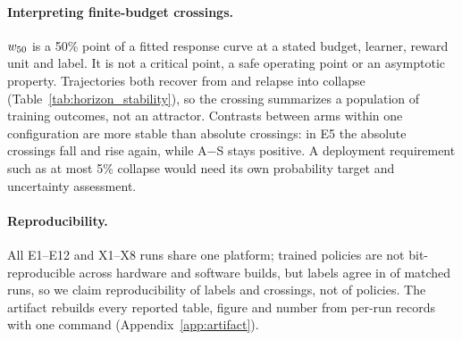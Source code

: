 \paragraph{Interpreting finite-budget crossings.}
$w_{50}$ is a 50\% point of a fitted response curve at a stated budget, learner, reward unit and label. It is
not a critical point, a safe operating point or an asymptotic property. Trajectories both recover from
and relapse into collapse (Table~\ref{tab:horizon_stability}), so the crossing summarizes a population of
training outcomes, not an attractor. Contrasts between arms within one configuration are more stable than
absolute crossings: in E5 the absolute crossings fall and rise again, while A$-$S stays positive. A
deployment requirement such as at most 5\% collapse would need its own probability target and uncertainty
assessment.

\paragraph{Reproducibility.}
All E1--E12 and X1--X8 runs share one platform; trained policies are not bit-reproducible across hardware and software
builds, but labels agree in \VfourAgreeControl{} of matched runs, so we claim reproducibility of labels and
crossings, not of policies. The artifact rebuilds every reported table, figure and number from per-run
records with one command (Appendix~\ref{app:artifact}).

